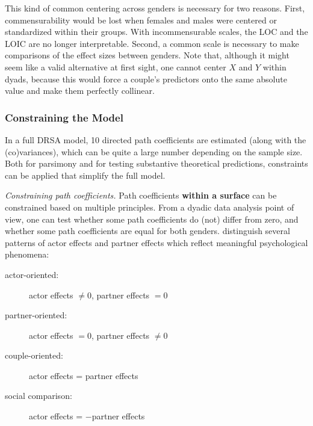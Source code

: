 \documentclass[jou,a4paper,draftfirst]{apa6}
\newcommand{\added}[1]{\textcolor{colour_added}{\bf{#1}}}
\begin{document}
This kind of common centering across genders is necessary for two reasons. First, commensurability would be lost when females and males were centered or standardized within their groups. With incommensurable scales, the LOC and the LOIC are no longer interpretable. Second, a common scale is necessary to make comparisons of the effect sizes between genders. Note that, although it might seem like a valid alternative at first sight, one cannot center $X$ and $Y$ within dyads, because this would force a couple’s predictors onto the same absolute value and make them perfectly collinear.

\subsubsection{Constraining the Model}
In a full DRSA model, 10 directed path coefficients are estimated (along with the (co)variances), which can be quite a large number depending on the sample size. Both for parsimony and for testing substantive theoretical predictions, constraints can be applied that simplify the full model.

\emph{Constraining path coefficients.}
Path coefficients \added{within a surface} can be constrained based on multiple principles. From a dyadic data analysis point of view, one can test whether some path coefficients do (not) differ from zero, and whether some path coefficients are equal for both genders. \textcite{kenny_partner_1999} distinguish several patterns of actor effects and partner effects which reflect meaningful psychological phenomena:

\begin{description}
	\item[actor-oriented:] actor effects $\neq 0$, partner effects $= 0$
	\item[partner-oriented:] actor effects $= 0$, partner effects $\neq 0$
	\item[couple-oriented:] actor effects = partner effects
	\item[social comparison:] actor effects = $-$partner effects
\end{description}
\end{document}
